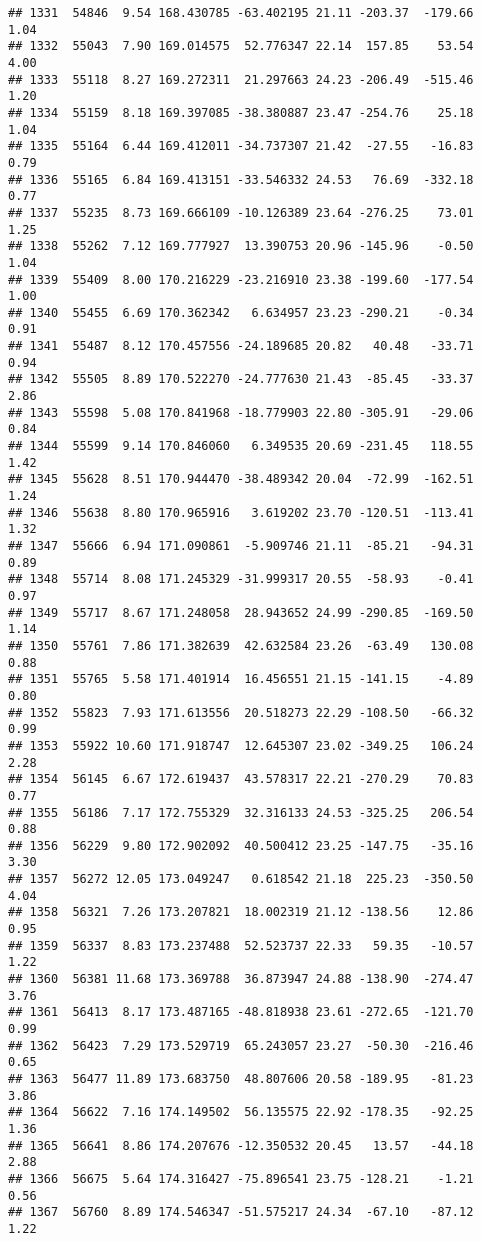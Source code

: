 \documentclass[]{article}
\begin{document}
\begin{verbatim}
## 1331  54846  9.54 168.430785 -63.402195 21.11 -203.37  -179.66  1.04
## 1332  55043  7.90 169.014575  52.776347 22.14  157.85    53.54  4.00
## 1333  55118  8.27 169.272311  21.297663 24.23 -206.49  -515.46  1.20
## 1334  55159  8.18 169.397085 -38.380887 23.47 -254.76    25.18  1.04
## 1335  55164  6.44 169.412011 -34.737307 21.42  -27.55   -16.83  0.79
## 1336  55165  6.84 169.413151 -33.546332 24.53   76.69  -332.18  0.77
## 1337  55235  8.73 169.666109 -10.126389 23.64 -276.25    73.01  1.25
## 1338  55262  7.12 169.777927  13.390753 20.96 -145.96    -0.50  1.04
## 1339  55409  8.00 170.216229 -23.216910 23.38 -199.60  -177.54  1.00
## 1340  55455  6.69 170.362342   6.634957 23.23 -290.21    -0.34  0.91
## 1341  55487  8.12 170.457556 -24.189685 20.82   40.48   -33.71  0.94
## 1342  55505  8.89 170.522270 -24.777630 21.43  -85.45   -33.37  2.86
## 1343  55598  5.08 170.841968 -18.779903 22.80 -305.91   -29.06  0.84
## 1344  55599  9.14 170.846060   6.349535 20.69 -231.45   118.55  1.42
## 1345  55628  8.51 170.944470 -38.489342 20.04  -72.99  -162.51  1.24
## 1346  55638  8.80 170.965916   3.619202 23.70 -120.51  -113.41  1.32
## 1347  55666  6.94 171.090861  -5.909746 21.11  -85.21   -94.31  0.89
## 1348  55714  8.08 171.245329 -31.999317 20.55  -58.93    -0.41  0.97
## 1349  55717  8.67 171.248058  28.943652 24.99 -290.85  -169.50  1.14
## 1350  55761  7.86 171.382639  42.632584 23.26  -63.49   130.08  0.88
## 1351  55765  5.58 171.401914  16.456551 21.15 -141.15    -4.89  0.80
## 1352  55823  7.93 171.613556  20.518273 22.29 -108.50   -66.32  0.99
## 1353  55922 10.60 171.918747  12.645307 23.02 -349.25   106.24  2.28
## 1354  56145  6.67 172.619437  43.578317 22.21 -270.29    70.83  0.77
## 1355  56186  7.17 172.755329  32.316133 24.53 -325.25   206.54  0.88
## 1356  56229  9.80 172.902092  40.500412 23.25 -147.75   -35.16  3.30
## 1357  56272 12.05 173.049247   0.618542 21.18  225.23  -350.50  4.04
## 1358  56321  7.26 173.207821  18.002319 21.12 -138.56    12.86  0.95
## 1359  56337  8.83 173.237488  52.523737 22.33   59.35   -10.57  1.22
## 1360  56381 11.68 173.369788  36.873947 24.88 -138.90  -274.47  3.76
## 1361  56413  8.17 173.487165 -48.818938 23.61 -272.65  -121.70  0.99
## 1362  56423  7.29 173.529719  65.243057 23.27  -50.30  -216.46  0.65
## 1363  56477 11.89 173.683750  48.807606 20.58 -189.95   -81.23  3.86
## 1364  56622  7.16 174.149502  56.135575 22.92 -178.35   -92.25  1.36
## 1365  56641  8.86 174.207676 -12.350532 20.45   13.57   -44.18  2.88
## 1366  56675  5.64 174.316427 -75.896541 23.75 -128.21    -1.21  0.56
## 1367  56760  8.89 174.546347 -51.575217 24.34  -67.10   -87.12  1.22

\end{verbatim}
\end{document}
